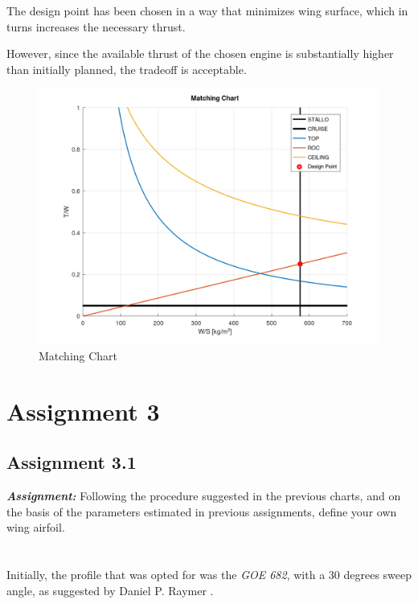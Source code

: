 \documentclass{article}
\begin{document}
The design point has been chosen in a way that minimizes wing surface, which in turns
increases the necessary thrust.

However, since the available thrust of the chosen engine is substantially higher than initially
planned, the tradeoff is acceptable.

\begin{figure}[h!]
    \centering
    \includegraphics[width=\textwidth]{Sources/Plots_and_Pictures/Matching_chart.png}
    \caption{Matching Chart}
    \label{matching_chart}
\end{figure}
\clearpage

\section{Assignment 3\label{Assignment_3}}

\subsection{Assignment 3.1\label{Assignment_3.1}}

\textbf{\textit{Assignment:}} Following the procedure suggested in the previous charts,
and on the basis of the parameters estimated in previous assignments,
define your own wing airfoil. \\ \\ \\ 

Initially, the profile that was opted for was the \textit{GOE 682}, with a 30 degrees sweep angle, 
as suggested by Daniel P. Raymer \autocite{Raymer_Daniel}.
\end{document}
